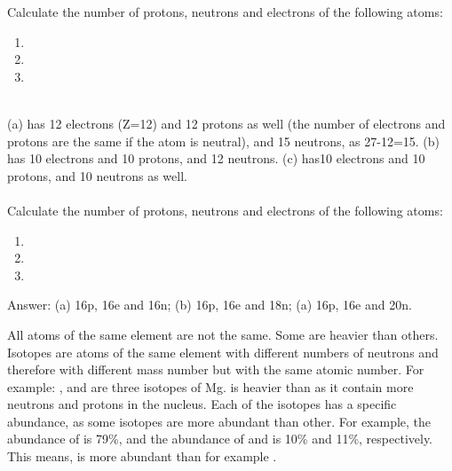 \documentclass[main.tex]{subfiles}
\begin{document}
\begin{description}
\begin{example} %
Calculate the number of protons, neutrons and electrons of the following atoms:
\begin{multicols}{3}
\begin{enumerate}[label=(\alph*)]
\item {} 
\item {} 
\item {} 
\end{enumerate}
\end{multicols}
\\
(a)    has 12 electrons (Z=12) and 12 protons as well (the number of electrons and protons are the same if the atom is neutral), and 15 neutrons, as 27-12=15. (b)   has 10 electrons and 10 protons, and 12 neutrons. (c)   has10 electrons and 10 protons, and 10 neutrons as well.  
\\
\faDiamond\ \\
Calculate the number of protons, neutrons and electrons of the following atoms:
\begin{multicols}{3}
\begin{enumerate}[label=(\alph*)]
\item {} 
\item {} 
\item {} 
\end{enumerate}\end{multicols}
\flushright Answer: (a) 16p, 16e and 16n; (b) 16p, 16e and 18n; (a) 16p, 16e and 20n. 
\end{example}%


\item[\docfilehook{Isotopes }{}] 
All atoms of the same element are not the same. Some are heavier than others. Isotopes are atoms of the same element with different numbers of neutrons and therefore with different mass number but with the same atomic number. For example:  ,   and   are three isotopes of Mg.    is heavier than   as it contain more neutrons and protons in the nucleus. Each of the isotopes has a specific abundance, as some isotopes are more abundant than other. For example, the abundance of  is 79\%, and the abundance of   and   is 10\% and 11\%, respectively. This means,  is more abundant than for example .


\end{description}
\end{document}
